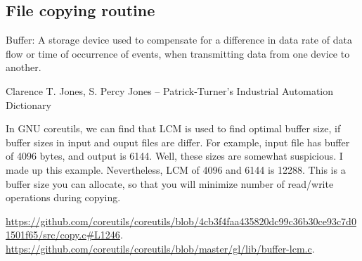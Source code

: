 \subsection{File copying routine}

\epigraph{Buffer: A storage device used to compensate for a difference in data rate of data flow or time of occurrence of events, when transmitting data from one device to another.}
{Clarence T. Jones, S. Percy Jones -- Patrick-Turner's Industrial Automation Dictionary}

In GNU coreutils, we can find that LCM is used to find optimal buffer size, if buffer sizes in input and ouput files are differ.
For example, input file has buffer of 4096 bytes, and output is 6144.
Well, these sizes are somewhat suspicious. I made up this example.
Nevertheless, LCM of 4096 and 6144 is 12288. This is a buffer size you can allocate, so that you will minimize number of read/write operations during copying.

\url{https://github.com/coreutils/coreutils/blob/4cb3f4faa435820dc99c36b30ce93c7d01501f65/src/copy.c#L1246}.
\url{https://github.com/coreutils/coreutils/blob/master/gl/lib/buffer-lcm.c}.

